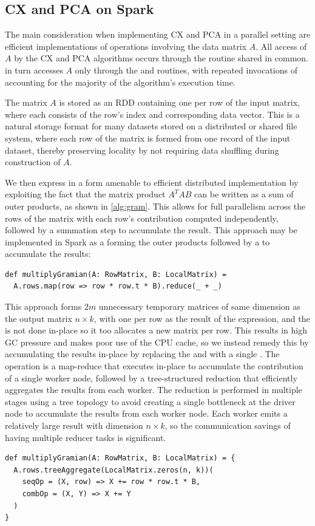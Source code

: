\subsection{CX and PCA on Spark}
\label{sec:cx_spark}
The main consideration when implementing CX and PCA in a parallel setting are
efficient implementations of operations involving the data matrix $A$.
All access of $A$ by the CX and PCA algorithms occurs through the
 routine shared in common.
 in turn accesses $A$ only through the  and
 routines, with repeated invocations of 
accounting for the majority of the algorithm's execution time.

The matrix $A$ is stored as an RDD containing one  per row of the input matrix,
where each  consists of the row's index and corresponding data vector.
This is a natural storage format for many datasets stored on a distributed or shared file
system, where each row of the matrix is formed from one record of the
input dataset, thereby preserving locality by not requiring data shuffling
during construction of $A$.

We then express  in a form amenable to efficient distributed implementation
by exploiting the fact that the matrix product $A^TAB$ can be written as a sum of outer products,
as shown in \ref{alg:gram}. This allows for full parallelism across the rows of the matrix with
each row's contribution computed independently, followed by a summation step to accumulate the result.
This approach may be implemented in Spark as a  forming the outer products followed by a 
to accumulate the results:
\begin{verbatim}
def multiplyGramian(A: RowMatrix, B: LocalMatrix) =
  A.rows.map(row => row * row.t * B).reduce(_ + _)
\end{verbatim}
This approach forms $2m$ unnecessary temporary matrices of same dimension as the output matrix $n\times k$,
with one per row as the result of the  expression, and the  is not done in-place so it
too allocates a new matrix per row.
This results in high GC pressure and makes poor use of the CPU cache, so
we instead remedy this by accumulating the results in-place by replacing the 
and  with a single .
The  operation is a map-reduce that executes in-place to accumulate the contribution of a 
single worker node, followed by a
tree-structured reduction that efficiently aggregates the results from each worker.
The reduction is performed in multiple stages using a tree topology to avoid creating a single
bottleneck at the driver node to accumulate the results from each worker node.
Each worker emits a relatively large result with dimension $n\times k$, so the
communication savings of having multiple reducer tasks is significant.
\begin{verbatim}
def multiplyGramian(A: RowMatrix, B: LocalMatrix) = {
  A.rows.treeAggregate(LocalMatrix.zeros(n, k))(
    seqOp = (X, row) => X += row * row.t * B,
    combOp = (X, Y) => X += Y
  )
}
\end{verbatim}



